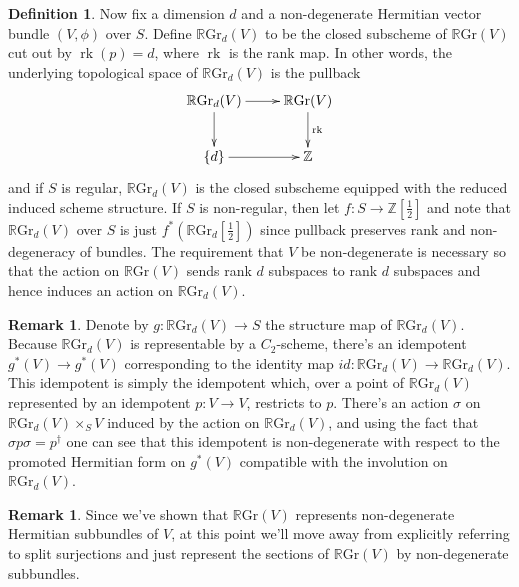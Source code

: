 \documentclass[edeposit,fullpage]{uiucthesis2009}
\newcommand{\Z}{\mathbb Z}
\newcommand{\RGr}{\mathbb R\mathrm{Gr}}
\DeclareMathOperator{\rk}{rk}
\theoremstyle{plain}
\numberwithin{lemma}{section}
\theoremstyle{definition}
\newtheorem{definition}[lemma]{Definition}
\newtheorem{remark}[lemma]{Remark}
\begin{document}
\begin{definition}

Now fix a dimension $d$ and a non-degenerate Hermitian vector bundle
$(V,\phi)$ over $S$.  Define $\RGr_d(V)$ to be the closed
subscheme of $\RGr(V)$ cut out by $\rk(p) = d$, where $\rk$ is the
rank map. In other words, the underlying topological space of $\RGr_d(V)$ is the pullback
\[
\xymatrix{\RGr_d(V) \ar[r]\ar[d] & \RGr(V) \ar[d]^{\rk} \\ \{d\}
  \ar[r] & \Z}
\]
and if $S$ is regular, $\RGr_d(V)$ is the closed subscheme equipped with the reduced
induced scheme structure. If $S$ is non-regular, then let $f : S
\rightarrow \Z[\frac{1}{2}]$ and note that $\RGr_d(V)$ over $S$ is
just $f^*(\RGr_d[\frac{1}{2}])$ since pullback preserves rank and
non-degeneracy of bundles. The requirement that $V$ be non-degenerate is necessary so that the action
on $\RGr(V)$ sends rank $d$ subspaces to rank $d$ subspaces and hence
induces an action on $\RGr_d(V)$. 
\end{definition}


\begin{remark}
Denote by $g : \RGr_d(V) \rightarrow S$ the structure map of
$\RGr_d(V)$.  Because $\RGr_d(V)$ is representable by a $C_2$-scheme, there's an
idempotent $g^*(V) \rightarrow g^*(V)$ corresponding to the identity map $id: \RGr_d(V) \rightarrow
\RGr_d(V)$. This idempotent is simply the idempotent which, over a
point of $\RGr_d(V)$ represented by an idempotent $p : V \rightarrow
V$, restricts to $p$. There's an action $\sigma$ on $\RGr_d(V) \times_S V$
induced by the action on $\RGr_d(V)$, and using the fact that $\sigma
p \sigma = p^\dagger$ one can see that this idempotent is
non-degenerate with respect to the promoted Hermitian form on $g^*(V)$
compatible with the involution on $\RGr_d(V)$.
\end{remark}

\begin{remark}
Since we've shown that $\RGr(V)$ represents non-degenerate Hermitian
subbundles of $V$, at this point we'll move away from explicitly
referring to split surjections and just represent the sections of
$\RGr(V)$ by non-degenerate subbundles. 
\end{remark}
\end{document}
